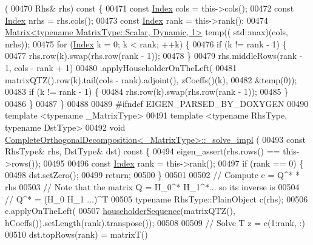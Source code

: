 \begin{DoxyCode}
      (
00470     Rhs& rhs)\textcolor{keyword}{ const }\{
00471   \textcolor{keyword}{const} \hyperlink{namespace_eigen_a62e77e0933482dafde8fe197d9a2cfde}{Index} cols = this->cols();
00472   \textcolor{keyword}{const} \hyperlink{namespace_eigen_a62e77e0933482dafde8fe197d9a2cfde}{Index} nrhs = rhs.cols();
00473   \textcolor{keyword}{const} \hyperlink{namespace_eigen_a62e77e0933482dafde8fe197d9a2cfde}{Index} rank = this->rank();
00474   \hyperlink{group___core___module_class_eigen_1_1_matrix}{Matrix<typename MatrixType::Scalar, Dynamic, 1>} temp((
      std::max)(cols, nrhs));
00475   \textcolor{keywordflow}{for} (\hyperlink{namespace_eigen_a62e77e0933482dafde8fe197d9a2cfde}{Index} k = 0; k < rank; ++k) \{
00476     \textcolor{keywordflow}{if} (k != rank - 1) \{
00477       rhs.row(k).swap(rhs.row(rank - 1));
00478     \}
00479     rhs.middleRows(rank - 1, cols - rank + 1)
00480         .applyHouseholderOnTheLeft(
00481             matrixQTZ().row(k).tail(cols - rank).adjoint(), zCoeffs()(k),
00482             &temp(0));
00483     \textcolor{keywordflow}{if} (k != rank - 1) \{
00484       rhs.row(k).swap(rhs.row(rank - 1));
00485     \}
00486   \}
00487 \}
00488 
00489 \textcolor{preprocessor}{#ifndef EIGEN\_PARSED\_BY\_DOXYGEN}
00490 \textcolor{keyword}{template} <\textcolor{keyword}{typename} \_MatrixType>
00491 \textcolor{keyword}{template} <\textcolor{keyword}{typename} RhsType, \textcolor{keyword}{typename} DstType>
00492 \textcolor{keywordtype}{void} \hyperlink{group___q_r___module_class_eigen_1_1_complete_orthogonal_decomposition}{CompleteOrthogonalDecomposition<\_MatrixType>::\_solve\_impl}
      (
00493     \textcolor{keyword}{const} RhsType& rhs, DstType& dst)\textcolor{keyword}{ const }\{
00494   eigen\_assert(rhs.rows() == this->rows());
00495 
00496   \textcolor{keyword}{const} \hyperlink{namespace_eigen_a62e77e0933482dafde8fe197d9a2cfde}{Index} rank = this->rank();
00497   \textcolor{keywordflow}{if} (rank == 0) \{
00498     dst.setZero();
00499     \textcolor{keywordflow}{return};
00500   \}
00501 
00502   \textcolor{comment}{// Compute c = Q^* * rhs}
00503   \textcolor{comment}{// Note that the matrix Q = H\_0^* H\_1^*... so its inverse is}
00504   \textcolor{comment}{// Q^* = (H\_0 H\_1 ...)^T}
00505   \textcolor{keyword}{typename} RhsType::PlainObject c(rhs);
00506   c.applyOnTheLeft(
00507       \hyperlink{group___householder___module_ga4bd4b85120e014cf1125a054b02d4d92}{householderSequence}(matrixQTZ(), hCoeffs()).setLength(rank).transpose());
00508 
00509   \textcolor{comment}{// Solve T z = c(1:rank, :)}
00510   dst.topRows(rank) = matrixT()

\end{DoxyCode}
